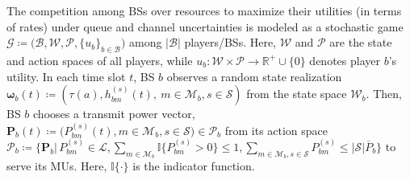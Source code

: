 \documentclass[conference]{IEEEtran}
\newcommand{\totalpower}[1]{%
	\overline{P}_{#1}%
}
\begin{document}
The competition among BSs over resources to maximize their utilities (in terms of rates) under queue and channel uncertainties  is modeled as a stochastic game
 $\mathcal{G}\coloneqq\big(\mathcal{B},\mathcal{W},\mathcal{P},\{u_{b}\}_{b\in\mathcal{B}}\big)$ among $|\mathcal{B}|$ players/BSs.
Here, $\mathcal{W}$ and $\mathcal{P}$ are the state and action spaces of all players,
while $u_{b}:\mathcal{W}\times\mathcal{P}\to\mathbb{R}^{+}\cup \{0\}$ denotes player $b$'s utility. In each time slot $t$, BS $b$ observes a random state realization $\boldsymbol{\omega}_b(t)\coloneqq (\tau(a),h_{bm}^{(s)}(t),~m\in\mathcal{M}_b,s\in\mathcal{S})$ from the state space $\mathcal{W}_b$.  Then, BS $b$ chooses a transmit power vector, {$\mathbf{P}_b(t)\coloneqq\big (  P^{(s)}_{bm}(t),m\in\mathcal{M}_b,s\in\mathcal{S}  \big ) \in\mathcal{P}_b$} from its action space {$\mathcal{P}_b\coloneqq\big\{\mathbf{P}_{b}\big|\,P_{bm}^{(s)}\in\mathcal{L},\sum_{m\in\mathcal{M}_b}\mathbb{I}\big\{ P_{bm}^{(s)}>0\big\}\leq 1,\sum_{m\in\mathcal{M}_b,s\in\mathcal{S}} P_{bm}^{(s)}\leq |\mathcal{S}|\totalpower{b}\big\}$} to serve its MUs.
Here, $\mathbb{I}\{\cdot\}$ is the indicator function.
%
\end{document}
